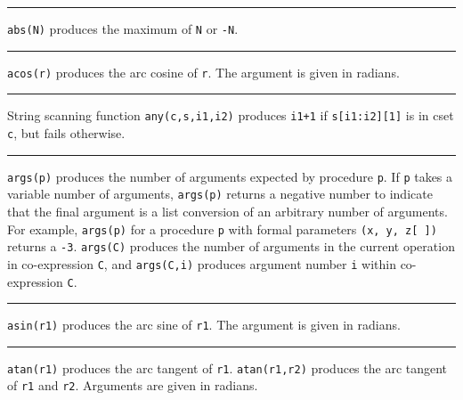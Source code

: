 \bigskip

\hrule\vspace{0.1cm}

\noindent {}\texttt{abs(N)} produces the maximum of
\texttt{N} or \texttt{{}-N}.

\bigskip

\hrule\vspace{0.1cm}

\noindent
{}\texttt{acos(r)} produces the arc cosine of
\texttt{r}. The argument is given in radians.

\bigskip

\hrule\vspace{0.1cm}

\noindent
{}String scanning function
\texttt{any(c,s,i1,i2)} produces \texttt{i1+1} if \texttt{s[i1:i2][1]}
is in cset \texttt{c}, but fails otherwise.

\bigskip

\hrule\vspace{0.1cm}

\noindent
{}\texttt{args(p)} produces the number of arguments
expected by procedure \texttt{p}. If \texttt{p} takes a variable number
of arguments, \texttt{args(p)} returns a negative number to indicate
that the final argument is a list conversion of an arbitrary number of
arguments. For example, \texttt{args(p)} for a procedure \texttt{p}
with formal parameters \texttt{(x, y, z[ ])} returns a \texttt{{}-3}.
\texttt{args(C)} produces the number of arguments in the current
operation in co-expression \texttt{C}, and \texttt{args(C,i)} produces
argument number \texttt{i} within co-expression \texttt{C}.

\bigskip

\hrule\vspace{0.1cm}

\noindent
{}\texttt{asin(r1)} produces the arc sine of \texttt{r1}.
The argument is given in radians.

\bigskip

\hrule\vspace{0.1cm}

\noindent
{}\texttt{atan(r1)} produces the arc tangent of
\texttt{r1}. \texttt{atan(r1,r2)} produces the arc tangent of
\texttt{r1} and \texttt{r2}. Arguments are given in radians.

